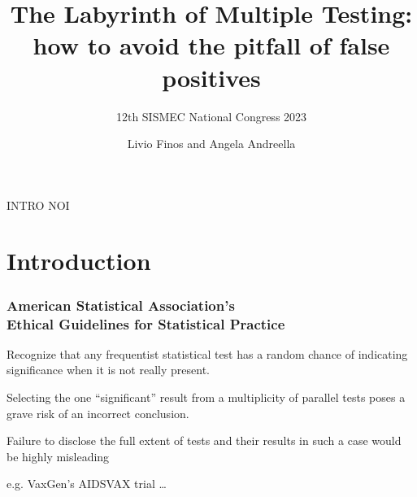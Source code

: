 \documentclass[xcolor={pdftex,dvipsnames,table}]{beamer}
\title[]{The Labyrinth of Multiple Testing: how to avoid the pitfall of false positives}
\subtitle{12th SISMEC National Congress 2023}
\author[\hspace{5cm}]{Livio Finos and Angela Andreella}
\date{}
\begin{document}
\begin{frame}
  \titlepage
\end{frame}

\begin{frame}
    INTRO NOI
\end{frame}

\section{Introduction}

\begin{frame}
\frametitle{American Statistical Association's\\
Ethical Guidelines for Statistical Practice}

Recognize that any frequentist %
statistical test has a random %
chance of indicating significance %
when it is not really present. %
\bigskip

Selecting the one ``significant'' %
result from a multiplicity of parallel  %
tests poses a grave risk of an  %
incorrect conclusion.   %
\bigskip

Failure to disclose the full extent %
of tests and their results in such  %
a case would be highly misleading %
\pause

\bigskip
e.g. VaxGen's AIDSVAX trial \ldots
\end{frame}
\end{document}
